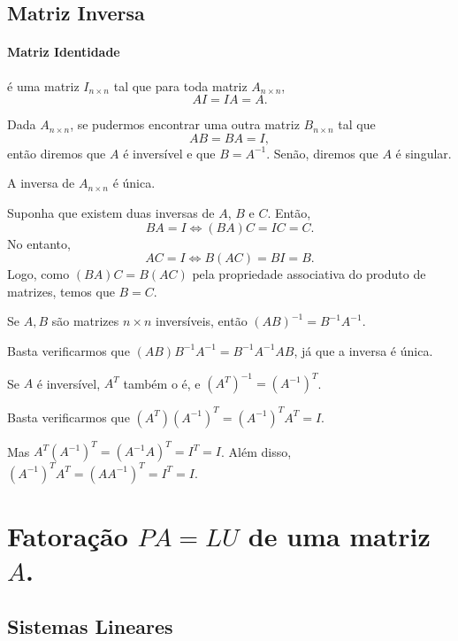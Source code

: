 \subsection{Matriz Inversa}

\paragraph*{Matriz Identidade} é uma matriz $I_{n\times n}$ tal que para toda matriz $A_{n\times n}$,
\begin{equation*}
	AI=IA=A.
\end{equation*}

Dada $A_{n\times n}$, se pudermos encontrar uma outra matriz $B_{n\times n}$ tal que 
$$AB=BA=I,$$
então diremos que $A$ é inversível e que $B=A^{-1}$. Senão, diremos que $A$ é singular.

\begin{teo}
   A inversa de $A_{n\times n}$ é única.
\end{teo}
\bpr
	Suponha que existem duas inversas de $A$, $B$ e $C$. Então, 
	$$BA = I \Leftrightarrow (BA)C = IC = C.$$
	No entanto, 
    $$AC = I \Leftrightarrow B(AC) = BI = B.$$
    Logo, como $(BA)C=B(AC)$ pela propriedade associativa do produto de matrizes, temos que $B=C$.
\epr

\begin{teo}
   Se $A, B$ são matrizes $n\times n$ inversíveis, então $(AB)^{-1} =
B^{-1}A^{-1}$.
\end{teo}
\bpr
	Basta verificarmos que $(AB)B^{-1}A^{-1} = B^{-1}A^{-1} AB$, já que a inversa é única.
\epr

\begin{teo}
   Se $A$ é inversível, $A^T$ também o é, e $(A^T)^{-1} = (A^{-1})^T$.
\end{teo}
\bpr
	Basta verificarmos que $(A^T)(A^{-1})^T = (A^{-1})^TA^T = I$.
	
	Mas $A^T(A^{-1})^T = (A^{-1}A)^T = I^T = I$. Além disso, $(A^{-1})^TA^T = (AA^{-1})^T = I^T = I.$
\epr

\section{Fatoração $PA=LU$ de uma matriz $A$.}

\subsection{Sistemas Lineares}

